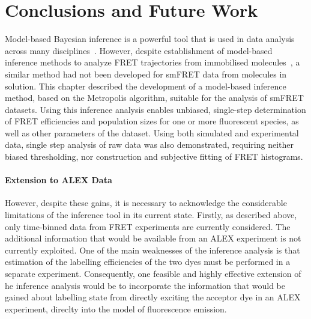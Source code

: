 \section{Conclusions and Future Work}
Model-based Bayesian inference is a powerful tool that is used in data analysis across many disciplines~\cite{mackay03}. However, despite establishment of model-based inference methods to analyze FRET trajectories from immobilised molecules~\cite{mckinney06, bronson09, bronson10, taylor10, taylor11}, a similar method had not been developed for smFRET data from molecules in solution. This chapter described the development of a model-based inference method, based on the Metropolis algorithm, suitable for the analysis of smFRET datasets. Using this inference analysis enables unbiased, single-step determination of FRET efficiencies and population sizes for one or more fluorescent species, as well as other parameters of the dataset. Using both simulated and experimental data, single step analysis of raw data was also demonstrated, requiring neither biased thresholding, nor construction and subjective fitting of FRET histograms. 

\paragraph{Extension to ALEX Data}
However, despite these gains, it is necessary to acknowledge the considerable limitations of the inference tool in its current state. Firstly, as described above, only time-binned data from FRET experiments are currently considered. The additional information that would be available from an ALEX experiment is not currently exploited. One of the main weaknesses of the inference analysis is that estimation of the labelling efficiencies of the two dyes must be performed in a separate experiment. Consequently, one feasible and highly effective extension of he inference analysis would be to incorporate the information that would be gained about labelling state from directly exciting the acceptor dye in an ALEX experiment, direclty into the model of fluorescence emission. 

